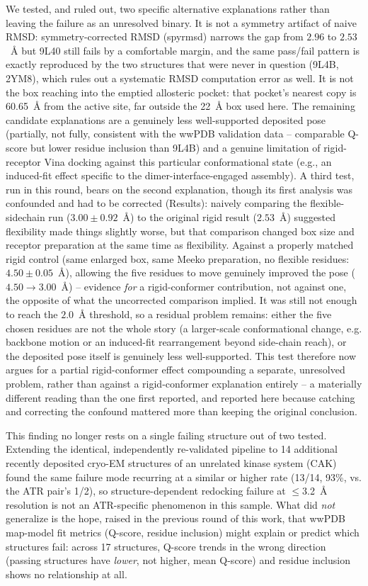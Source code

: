 \documentclass[11pt]{article}
\begin{document}
We tested, and ruled out, two specific alternative explanations rather than
leaving the failure as an unresolved binary. It is not a symmetry artifact
of naive RMSD: symmetry-corrected RMSD (spyrmsd) narrows the gap from
$2.96$ to $2.53$~{\AA} but 9L40 still fails by a comfortable margin, and the
same pass/fail pattern is exactly reproduced by the two structures that
were never in question (9L4B, 2YM8), which rules out a systematic RMSD
computation error as well. It is not the box reaching into the emptied
allosteric pocket: that pocket's nearest copy is 60.65~{\AA} from the
active site, far outside the 22~{\AA} box used here. The remaining
candidate explanations are a genuinely less well-supported deposited pose
(partially, not fully, consistent with the wwPDB validation data --
comparable Q-score but lower residue inclusion than 9L4B) and a genuine
limitation of rigid-receptor Vina docking against this particular
conformational state (e.g., an induced-fit effect specific to the
dimer-interface-engaged assembly). A third test, run in this round, bears
on the second explanation, though its first analysis was confounded and
had to be corrected (Results): naively comparing the flexible-sidechain
run ($3.00\pm0.92$~{\AA}) to the original rigid result ($2.53$~{\AA})
suggested flexibility made things slightly worse, but that comparison
changed box size and receptor preparation at the same time as
flexibility. Against a properly matched rigid control (same enlarged box,
same Meeko preparation, no flexible residues: $4.50\pm0.05$~{\AA}),
allowing the five residues to move genuinely improved the pose
($4.50\rightarrow3.00$~{\AA}) -- evidence \emph{for} a rigid-conformer
contribution, not against one, the opposite of what the uncorrected
comparison implied. It was still not enough to reach the $2.0$~{\AA}
threshold, so a residual problem remains: either the five chosen residues
are not the whole story (a larger-scale conformational change, e.g.
backbone motion or an induced-fit rearrangement beyond side-chain
reach), or the deposited pose itself is genuinely less well-supported.
This test therefore now argues for a partial rigid-conformer effect
compounding a separate, unresolved problem, rather than against a
rigid-conformer explanation entirely -- a materially different reading
than the one first reported, and reported here because catching and
correcting the confound mattered more than keeping the original
conclusion.

This finding no longer rests on a single failing structure out of two
tested. Extending the identical, independently re-validated pipeline to 14
additional recently deposited cryo-EM structures of an unrelated kinase
system (CAK) found the same failure mode recurring at a similar or higher
rate (13/14, 93\%, vs. the ATR pair's 1/2), so structure-dependent
redocking failure at $\leq$3.2~{\AA} resolution is not an ATR-specific
phenomenon in this sample. What did \emph{not} generalize is the hope,
raised in the previous round of this work, that wwPDB map-model fit
metrics (Q-score, residue inclusion) might explain or predict which
structures fail: across 17 structures, Q-score trends in the wrong
direction (passing structures have \emph{lower}, not higher, mean
Q-score) and residue inclusion shows no relationship at all.
\end{document}
